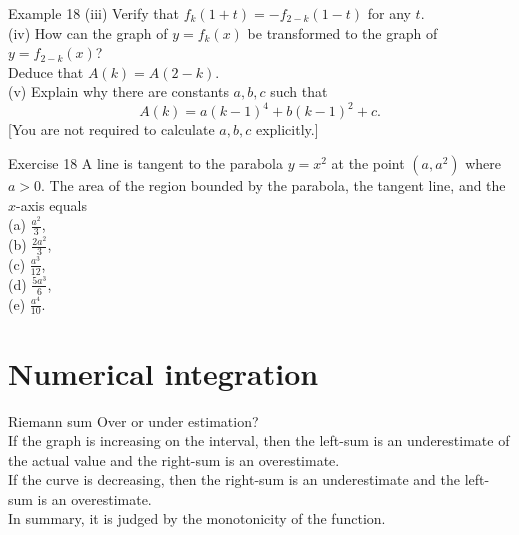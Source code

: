 \documentclass{beamer}
\begin{document}
\begin{frame}{Example 18}
(iii) Verify that $f_k(1+t)=-f_{2-k}(1-t)$ for any $t$.\\
(iv) How can the graph of $y=f_k(x)$ be transformed to the graph of $y=f_{2-k}(x)$?\\
Deduce that $A(k)=A(2-k)$.\\
(v) Explain why there are constants $a, b, c$ such that
$$
A(k)=a(k-1)^4+b(k-1)^2+c .
$$
[You are not required to calculate $a, b, c$ explicitly.]
\end{frame}

\begin{frame}{Exercise 18}
A line is tangent to the parabola $y=x^2$ at the point $\left(a, a^2\right)$ where $a>0$. The area of the region bounded by the parabola, the tangent line, and the $x$-axis equals\\
(a) $\frac{a^2}{3}$,\\
(b) $\frac{2 a^2}{3}$,\\
(c) $\frac{a^3}{12}$,\\
(d) $\frac{5 a^3}{6}$,\\
(e) $\frac{a^4}{10}$. 
\end{frame}


\section{Numerical integration}
\begin{frame}{Riemann sum}
    Over or under estimation?\\
   If the graph is increasing on the interval, then the left-sum is an underestimate of the actual value and the right-sum is an overestimate.\\
   If the curve is decreasing, then the right-sum is an underestimate and the left-sum is an overestimate.\\
   In summary, it is judged by the monotonicity of the function.
\end{frame}
\end{document}
